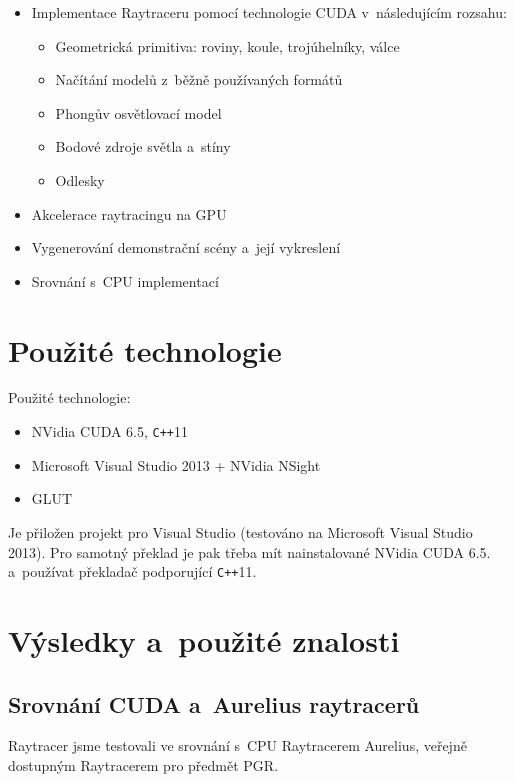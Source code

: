 \documentclass[12pt,a4paper,titlepage,final]{report}
\begin{document}
\begin{itemize}
	\item Implementace Raytraceru pomocí technologie CUDA v~následujícím rozsahu:
	\begin{itemize}
		\item Geometrická primitiva: roviny, koule, trojúhelníky, válce
		\item Načítání modelů z~běžně používaných formátů
		\item Phongův osvětlovací model
		\item Bodové zdroje světla a~stíny
		\item Odlesky
	\end{itemize}
	\item Akcelerace raytracingu na GPU
	\item Vygenerování demonstrační scény a~její vykreslení
	\item Srovnání s~CPU implementací
\end{itemize}

\section{Použité technologie}

Použité technologie:

\begin{itemize}
	\item NVidia CUDA 6.5, \verb!C++!11
	\item Microsoft Visual Studio 2013 + NVidia NSight
	\item GLUT
\end{itemize}

Je přiložen projekt pro Visual Studio (testováno na Microsoft Visual Studio 2013). Pro samotný překlad je pak třeba mít nainstalované NVidia CUDA 6.5. a~používat překladač podporující \verb!C++!11.

\section{Výsledky a~použité znalosti}

\subsection{Srovnání CUDA a~Aurelius raytracerů}

Raytracer jsme testovali ve srovnání s~CPU Raytracerem Aurelius, veřejně dostupným Raytracerem pro předmět PGR.
\end{document}

